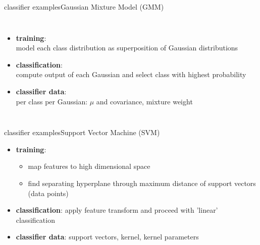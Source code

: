         \begin{frame}{classifier examples}{Gaussian Mixture Model (GMM)}
            \vspace{-3mm}
             \begin{columns}
                   \begin{itemize}
                        \item	\textbf{training}:\\ model each class distribution as superposition of Gaussian distributions
                        \item<2->	\textbf{classification}:\\ compute output of each Gaussian and select class with highest probability
                        \item<3->	\textbf{classifier data}:\\ per class per Gaussian: $\mu$ and covariance, mixture weight
                    \end{itemize}
                \vspace{-13mm}
            \end{columns}
        \end{frame}
        \begin{frame}{classifier examples}{Support Vector Machine (SVM)}
            \begin{itemize}
                \item	\textbf{training}:
                    \begin{itemize}
                        \item   map features to high dimensional space
                        \item   find separating hyperplane through maximum distance of support vectors (data points)
                    \end{itemize}
                \item<2->	\textbf{classification}: apply feature transform and proceed with 'linear' classification
                \item<3->	\textbf{classifier data}: support vectors, kernel, kernel parameters
            \end{itemize}
        \end{frame}
    
